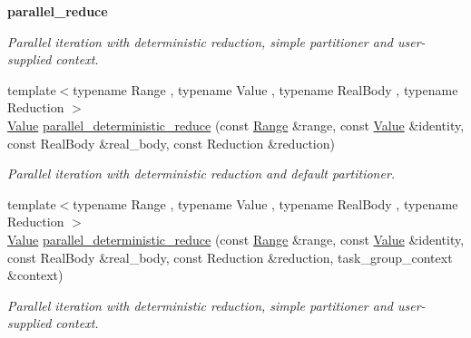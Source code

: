 \begin{Indent}{\bf parallel\+\_\+reduce}
\begin{DoxyCompactItemize}
\begin{DoxyCompactList}\small\item\em Parallel iteration with deterministic reduction, simple partitioner and user-\/supplied context. \end{DoxyCompactList}\item 
{\footnotesize template$<$typename Range , typename Value , typename Real\+Body , typename Reduction $>$ }\\\hyperlink{structValue}{Value} \hyperlink{group__algorithms_ga7f69e6a632acb51ed26a43ebd331f349}{parallel\+\_\+deterministic\+\_\+reduce} (const \hyperlink{classtbb_1_1blocked__range}{Range} \&range, const \hyperlink{structValue}{Value} \&identity, const Real\+Body \&real\+\_\+body, const Reduction \&reduction)
\begin{DoxyCompactList}\small\item\em Parallel iteration with deterministic reduction and default partitioner. \end{DoxyCompactList}\item 
{\footnotesize template$<$typename Range , typename Value , typename Real\+Body , typename Reduction $>$ }\\\hyperlink{structValue}{Value} \hyperlink{group__algorithms_ga69b4eea059a62cbbf409cbad02b70bfa}{parallel\+\_\+deterministic\+\_\+reduce} (const \hyperlink{classtbb_1_1blocked__range}{Range} \&range, const \hyperlink{structValue}{Value} \&identity, const Real\+Body \&real\+\_\+body, const Reduction \&reduction, task\+\_\+group\+\_\+context \&context)
\begin{DoxyCompactList}\small\item\em Parallel iteration with deterministic reduction, simple partitioner and user-\/supplied context. \end{DoxyCompactList}\end{DoxyCompactItemize}
\end{Indent}
